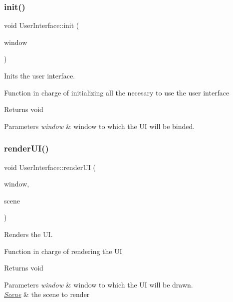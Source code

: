 \subsubsection{\texorpdfstring{init()}{init()}}
{\footnotesize\ttfamily void User\+Interface\+::init (\begin{DoxyParamCaption}\item[{sf\+::\+Render\+Window \&}]{window }\end{DoxyParamCaption})}



Inits the user interface. 

Function in charge of initializing all the necesary to use the user interface

\begin{DoxyReturn}{Returns}
void 
\end{DoxyReturn}

\begin{DoxyParams}{Parameters}
{\em window} & window to which the UI will be binded. \\
\hline
\end{DoxyParams}
\mbox{\label{class_user_interface_abdff7c45be86654013ba3b90f58205ec}} 
\subsubsection{\texorpdfstring{render\+U\+I()}{renderUI()}}
{\footnotesize\ttfamily void User\+Interface\+::render\+UI (\begin{DoxyParamCaption}\item[{sf\+::\+Render\+Window \&}]{window,  }\item[{\hyperlink{class_scene}{Scene} \&}]{scene }\end{DoxyParamCaption})}



Renders the UI. 

Function in charge of rendering the UI

\begin{DoxyReturn}{Returns}
void 
\end{DoxyReturn}

\begin{DoxyParams}{Parameters}
{\em window} & window to which the UI will be drawn. \\
\hline
{\em \hyperlink{class_scene}{Scene}} & the scene to render \\
\hline
\end{DoxyParams}
\mbox{\label{class_user_interface_a4fa32deeece39dc97a231d7add5123d2}} 

